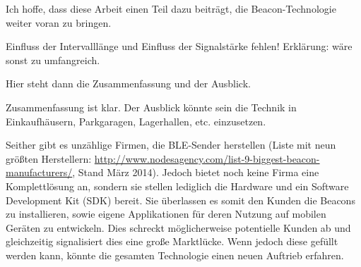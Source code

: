 Ich hoffe, dass diese Arbeit einen Teil dazu beiträgt, die Beacon-Technologie weiter voran zu bringen. 

Einfluss der Intervalllänge und Einfluss der Signalstärke fehlen! Erklärung: wäre sonst zu umfangreich.



Hier steht dann die Zusammenfassung und der Ausblick.


Zusammenfassung ist klar. Der Ausblick könnte sein die Technik in Einkaufhäusern, Parkgaragen, Lagerhallen, etc. einzusetzen. 

Seither gibt es unzählige Firmen, die BLE-Sender herstellen (Liste mit neun größten Herstellern: \url{http://www.nodesagency.com/list-9-biggest-beacon-manufacturers/}, Stand März 2014). Jedoch bietet noch keine Firma eine Komplettlösung an, sondern sie stellen lediglich die Hardware und ein Software Development Kit (SDK) bereit. Sie überlassen es somit den Kunden die Beacons zu installieren, sowie eigene Applikationen für deren Nutzung auf mobilen Geräten zu entwickeln. Dies schreckt möglicherweise potentielle Kunden ab und gleichzeitig signalisiert dies eine große Marktlücke. Wenn jedoch diese gefüllt werden kann, könnte die gesamten Technologie einen neuen Auftrieb erfahren.